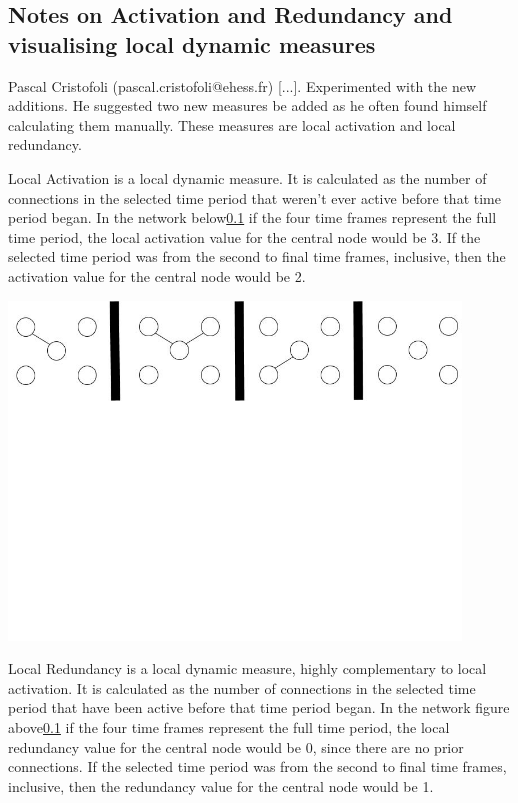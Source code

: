 \subsection{Notes on Activation and Redundancy and visualising local dynamic measures}

Pascal Cristofoli (pascal.cristofoli@ehess.fr) [...]. Experimented with the new additions. He suggested two new measures be added as he often found himself calculating them manually. These measures are local activation and local redundancy.

Local Activation is a local dynamic measure. It is calculated as the number of connections in the selected time period that weren't ever active before that time period began. In the network below\ref{} if the four time frames represent the full time period, the local activation value for the central node would be 3. If the selected time period was from the second to final time frames, inclusive, then the activation value for the central node would be 2.
\begin{center}
\includegraphics[trim={0 10cm 0 -1cm}, width=120mm]{./Figures/localActivation1.jpg}
\end{center}

Local Redundancy is a local dynamic measure, highly complementary to local activation. It is calculated as the number of connections in the selected time period that have been active before that time period began. In the network figure above\ref{} if the four time frames represent the full time period, the local redundancy value for the central node would be 0, since there are no prior connections. If the selected time period was from the second to final time frames, inclusive, then the redundancy value for the central node would be 1.

